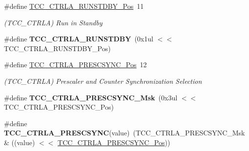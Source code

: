 \begin{DoxyCompactItemize}
\item 
\hypertarget{group___s_a_m_l21___t_c_c_gad4940135e9de784a03c547a7a94bffd1}{}\#define \hyperlink{group___s_a_m_l21___t_c_c_gad4940135e9de784a03c547a7a94bffd1}{T\+C\+C\+\_\+\+C\+T\+R\+L\+A\+\_\+\+R\+U\+N\+S\+T\+D\+B\+Y\+\_\+\+Pos}~11\label{group___s_a_m_l21___t_c_c_gad4940135e9de784a03c547a7a94bffd1}

\begin{DoxyCompactList}\small\item\em (T\+C\+C\+\_\+\+C\+T\+R\+L\+A) Run in Standby \end{DoxyCompactList}\item 
\hypertarget{group___s_a_m_l21___t_c_c_ga36d50d739b682070bf20f27a1d0cf8b1}{}\#define {\bfseries T\+C\+C\+\_\+\+C\+T\+R\+L\+A\+\_\+\+R\+U\+N\+S\+T\+D\+B\+Y}~(0x1ul $<$$<$ T\+C\+C\+\_\+\+C\+T\+R\+L\+A\+\_\+\+R\+U\+N\+S\+T\+D\+B\+Y\+\_\+\+Pos)\label{group___s_a_m_l21___t_c_c_ga36d50d739b682070bf20f27a1d0cf8b1}

\item 
\hypertarget{group___s_a_m_l21___t_c_c_ga779b0a47e8b363609fc5d3f20c62288a}{}\#define \hyperlink{group___s_a_m_l21___t_c_c_ga779b0a47e8b363609fc5d3f20c62288a}{T\+C\+C\+\_\+\+C\+T\+R\+L\+A\+\_\+\+P\+R\+E\+S\+C\+S\+Y\+N\+C\+\_\+\+Pos}~12\label{group___s_a_m_l21___t_c_c_ga779b0a47e8b363609fc5d3f20c62288a}

\begin{DoxyCompactList}\small\item\em (T\+C\+C\+\_\+\+C\+T\+R\+L\+A) Prescaler and Counter Synchronization Selection \end{DoxyCompactList}\item 
\hypertarget{group___s_a_m_l21___t_c_c_ga9b37de08d095e3149dabb890d3417d24}{}\#define {\bfseries T\+C\+C\+\_\+\+C\+T\+R\+L\+A\+\_\+\+P\+R\+E\+S\+C\+S\+Y\+N\+C\+\_\+\+Msk}~(0x3ul $<$$<$ T\+C\+C\+\_\+\+C\+T\+R\+L\+A\+\_\+\+P\+R\+E\+S\+C\+S\+Y\+N\+C\+\_\+\+Pos)\label{group___s_a_m_l21___t_c_c_ga9b37de08d095e3149dabb890d3417d24}

\item 
\hypertarget{group___s_a_m_l21___t_c_c_ga9a9da51fb03513387f9740b592d681b1}{}\#define {\bfseries T\+C\+C\+\_\+\+C\+T\+R\+L\+A\+\_\+\+P\+R\+E\+S\+C\+S\+Y\+N\+C}(value)~(T\+C\+C\+\_\+\+C\+T\+R\+L\+A\+\_\+\+P\+R\+E\+S\+C\+S\+Y\+N\+C\+\_\+\+Msk \& ((value) $<$$<$ \hyperlink{group___s_a_m_l21___t_c_c_ga779b0a47e8b363609fc5d3f20c62288a}{T\+C\+C\+\_\+\+C\+T\+R\+L\+A\+\_\+\+P\+R\+E\+S\+C\+S\+Y\+N\+C\+\_\+\+Pos}))\label{group___s_a_m_l21___t_c_c_ga9a9da51fb03513387f9740b592d681b1}


\end{DoxyCompactItemize}
